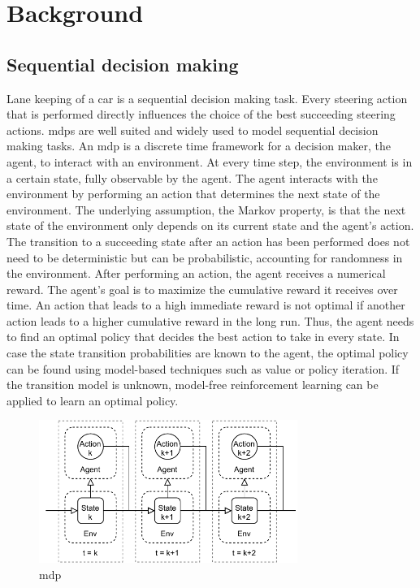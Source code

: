 \chapter{Background}
\label{sec:theory}

\section{Sequential decision making}

Lane keeping of a car is a sequential decision making task. Every steering action that is performed directly influences the choice of the best succeeding steering actions. \Glspl{mdp} are well suited and widely used to model sequential decision making tasks. An \gls{mdp} is a discrete time framework for a decision maker, the agent, to interact with an environment. At every time step, the environment is in a certain state, fully observable by the agent. The agent interacts with the environment by performing an action that determines the next state of the environment. The underlying assumption, the Markov property, is that the next state of the environment only depends on its current state and the agent's action. The transition to a succeeding state after an action has been performed does not need to be deterministic but can be probabilistic, accounting for randomness in the environment. After performing an action, the agent receives a numerical reward. The agent's goal is to maximize the cumulative reward it receives over time. An action that leads to a high immediate reward is not optimal if another action leads to a higher cumulative reward in the long run. Thus, the agent needs to find an optimal policy that decides the best action to take in every state. In case the state transition probabilities are known to the agent, the optimal policy can be found using model-based techniques such as value or policy iteration. If the transition model is unknown, model-free reinforcement learning can be applied to learn an optimal policy. %

\begin{figure}[htbp]
    \centering
    \includegraphics[width=0.75\textwidth]{figures/MDP.pdf}
    \caption{\acrfull{mdp}}
\end{figure}

